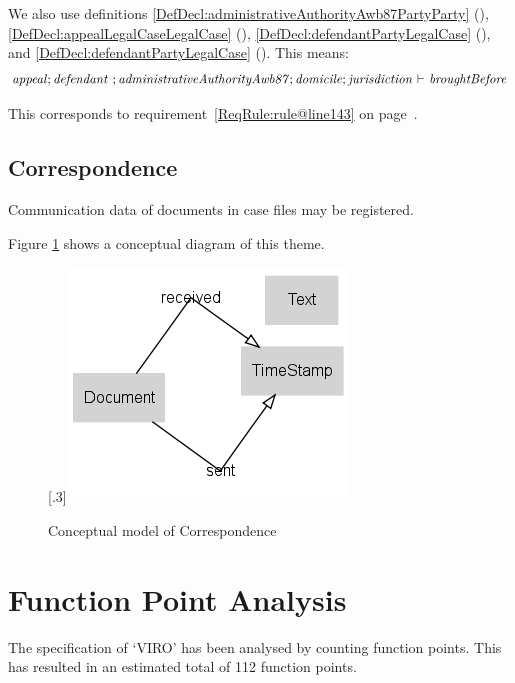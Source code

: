 \documentclass[10pt,a4paper]{report}              %
\theoremstyle{plain}\theorembodyfont{\rmfamily}\newtheorem{definition}{Definition}[section]
\theoremstyle{plain}\theorembodyfont{\rmfamily}\newtheorem{designrule}[definition]{Requirement}
\def\id#1{\mbox{\em #1\/}}
\begin{document}
\begin{description}
We also use definitions \ref{DefDecl:administrativeAuthorityAwb87PartyParty} ({}), \ref{DefDecl:appealLegalCaseLegalCase} ({}), \ref{DefDecl:defendantPartyLegalCase} ({}), and \ref{DefDecl:defendantPartyLegalCase} ({}). 
This means: 
\begin{equation}
   {\id{appeal}};{\id{defendant}}~;{\id{administrativeAuthorityAwb87}};{\id{domicile}};{\id{jurisdiction}}\ {\vdash}\ {\id{broughtBefore}}\label{DefRule:rule@line143}
\end{equation}

This corresponds to requirement~\ref{ReqRule:rule@line143} on page~\pageref{ReqRule:rule@line143}.
\end{description}
\section{Correspondence}

Communication data of documents in case files may be registered.

Figure \ref{fig:PatCorrespondence} shows a conceptual diagram of this theme.

\begin{figure}[htb]
\begin{center}
\scalebox{.3}[.3]{\includegraphics{PatCorrespondence}}
\caption{Conceptual model of Correspondence}
\label{fig:PatCorrespondence}
\end{center}
\end{figure}
\chapter{Function Point Analysis}\label{chpFPAnalysis}

The specification of `VIRO' has been analysed by counting function points\cite{IFPUG}. This has resulted in an estimated total of 112 function points.
\end{document}
